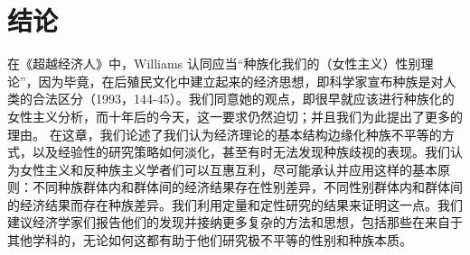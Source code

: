 \documentclass[UTF8]{ctexart}
\begin{document}
\section{结论}在《超越经济人》中，Williams 认同应当“种族化我们的（女性主义）性别理论”，因为毕竟，在后殖民文化中建立起来的经济思想，即科学家宣布种族是对人类的合法区分（1993，144-45）。我们同意她的观点，即很早就应该进行种族化的女性主义分析，而十年后的今天，这一要求仍然迫切；并且我们为此提出了更多的理由。
在这章，我们论述了我们认为经济理论的基本结构边缘化种族不平等的方式，以及经验性的研究策略如何淡化，甚至有时无法发现种族歧视的表现。我们认为女性主义和反种族主义学者们可以互惠互利，尽可能承认并应用这样的基本原则：不同种族群体内和群体间的经济结果存在性别差异，不同性别群体内和群体间的经济结果而存在种族差异。我们利用定量和定性研究的结果来证明这一点。我们建议经济学家们报告他们的发现并接纳更多复杂的方法和思想，包括那些在来自于其他学科的，无论如何这都有助于他们研究极不平等的性别和种族本质。
\end{document}
